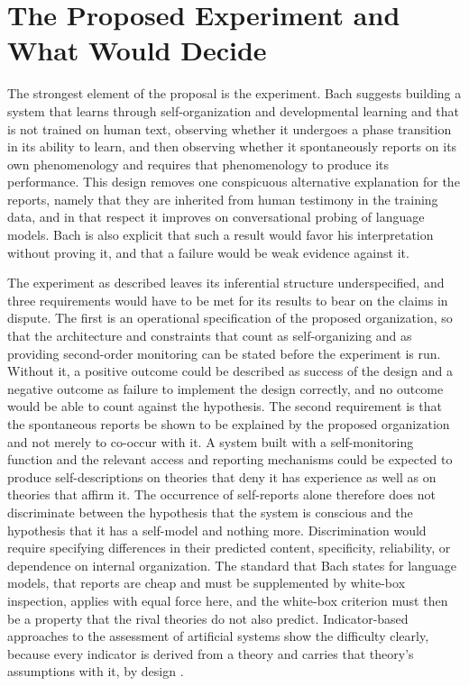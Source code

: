 \documentclass[11pt]{article}
\begin{document}
\section{The Proposed Experiment and What Would Decide}

The strongest element of the proposal is the experiment. Bach suggests building a system that learns through self-organization and developmental learning and that is not trained on human text, observing whether it undergoes a phase transition in its ability to learn, and then observing whether it spontaneously reports on its own phenomenology and requires that phenomenology to produce its performance. This design removes one conspicuous alternative explanation for the reports, namely that they are inherited from human testimony in the training data, and in that respect it improves on conversational probing of language models. Bach is also explicit that such a result would favor his interpretation without proving it, and that a failure would be weak evidence against it.

The experiment as described leaves its inferential structure underspecified, and three requirements would have to be met for its results to bear on the claims in dispute. The first is an operational specification of the proposed organization, so that the architecture and constraints that count as self-organizing and as providing second-order monitoring can be stated before the experiment is run. Without it, a positive outcome could be described as success of the design and a negative outcome as failure to implement the design correctly, and no outcome would be able to count against the hypothesis. The second requirement is that the spontaneous reports be shown to be explained by the proposed organization and not merely to co-occur with it. A system built with a self-monitoring function and the relevant access and reporting mechanisms could be expected to produce self-descriptions on theories that deny it has experience as well as on theories that affirm it. The occurrence of self-reports alone therefore does not discriminate between the hypothesis that the system is conscious and the hypothesis that it has a self-model and nothing more. Discrimination would require specifying differences in their predicted content, specificity, reliability, or dependence on internal organization. The standard that Bach states for language models, that reports are cheap and must be supplemented by white-box inspection, applies with equal force here, and the white-box criterion must then be a property that the rival theories do not also predict. Indicator-based approaches to the assessment of artificial systems show the difficulty clearly, because every indicator is derived from a theory and carries that theory's assumptions with it, by design \cite{butlin2023}.
\end{document}

